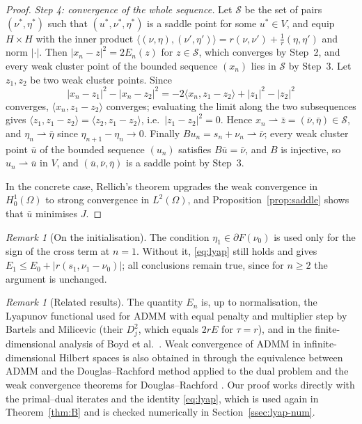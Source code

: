 \documentclass[11pt]{amsart}
\theoremstyle{definition}
\theoremstyle{remark}
\newtheorem{remark}[theorem]{Remark}
\numberwithin{equation}{section}
\newcommand{\Sad}{\mathcal{S}}
\newcommand{\abs}[1]{\lvert #1\rvert}
\newcommand{\weak}{\rightharpoonup}
\begin{document}
\begin{proof}
\emph{Step 4: convergence of the whole sequence.} Let $\Sad$ be the set of pairs $(\nu^*,\eta^*)$ such that $(u^*,\nu^*,\eta^*)$ is a saddle point for some $u^*\in V$, and equip $H\times H$ with the inner product $\langle(\nu,\eta),(\nu',\eta')\rangle=r(\nu,\nu')+\frac1r(\eta,\eta')$ and norm $\abs\cdot$. Then $\abs{x_n-z}^2=2E_n(z)$ for $z\in\Sad$, which converges by Step~2, and every weak cluster point of the bounded sequence $(x_n)$ lies in $\Sad$ by Step~3. Let $z_1,z_2$ be two weak cluster points. Since
\[
\abs{x_n-z_1}^2-\abs{x_n-z_2}^2=-2\langle x_n,z_1-z_2\rangle+\abs{z_1}^2-\abs{z_2}^2
\]
converges, $\langle x_n,z_1-z_2\rangle$ converges; evaluating the limit along the two subsequences gives $\langle z_1,z_1-z_2\rangle=\langle z_2,z_1-z_2\rangle$, i.e.\ $\abs{z_1-z_2}^2=0$. Hence $x_n\weak\bar z=(\bar\nu,\bar\eta)\in\Sad$, and $\eta_n\weak\bar\eta$ since $\eta_{n+1}-\eta_n\to0$. Finally $Bu_n=s_n+\nu_n\weak\bar\nu$; every weak cluster point $\bar u$ of the bounded sequence $(u_n)$ satisfies $B\bar u=\bar\nu$, and $B$ is injective, so $u_n\weak\bar u$ in $V$, and $(\bar u,\bar\nu,\bar\eta)$ is a saddle point by Step~3.

In the concrete case, Rellich's theorem upgrades the weak convergence in $H^1_0(\Omega)$ to strong convergence in $L^2(\Omega)$, and Proposition~\ref{prop:saddle} shows that $\bar u$ minimises $J$.
\end{proof}

\begin{remark}[On the initialisation]\label{rem:init}
The condition $\eta_1\in\partial F(\nu_0)$ is used only for the sign of the cross term at $n=1$. Without it, \eqref{eq:lyap} still holds and gives $E_1\le E_0+\abs{r(s_1,\nu_1-\nu_0)}$; all conclusions remain true, since for $n\ge2$ the argument is unchanged.
\end{remark}

\begin{remark}[Related results]\label{rem:A-literature}
The quantity $E_n$ is, up to normalisation, the Lyapunov functional used for ADMM with equal penalty and multiplier step by Bartels and Milicevic \cite[Thm.~3.7]{BartelsMilicevic2017} (their $D_j^2$, which equals $2rE$ for $\tau=r$), and in the finite-dimensional analysis of Boyd et al.\ \cite[App.~A]{Boyd2011ADMM}. Weak convergence of ADMM in infinite-dimensional Hilbert spaces is also obtained in \cite{MoradifamNachman2011} through the equivalence between ADMM and the Douglas--Rachford method applied to the dual problem \cite{Gabay1983,GlowinskiPanTai2016} and the weak convergence theorems for Douglas--Rachford \cite{LionsMercier1979,EcksteinBertsekas1992,Svaiter2011,BauschkeCombettes2017}. Our proof works directly with the primal--dual iterates and the identity \eqref{eq:lyap}, which is used again in Theorem~\ref{thm:B} and is checked numerically in Section~\ref{ssec:lyap-num}.
\end{remark}
\end{document}
